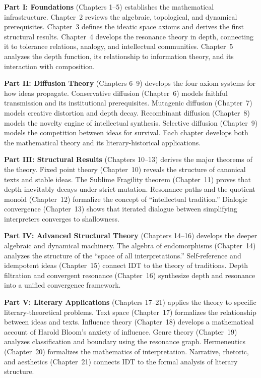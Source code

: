 \documentclass[11pt,openany]{book}
\theoremstyle{definition}
\theoremstyle{plain}
\theoremstyle{remark}
\begin{document}
\textbf{Part I: Foundations} (Chapters 1--5) establishes the mathematical infrastructure. Chapter~2 reviews the algebraic, topological, and dynamical prerequisites. Chapter~3 defines the ideatic space axioms and derives the first structural results. Chapter~4 develops the resonance theory in depth, connecting it to tolerance relations, analogy, and intellectual communities. Chapter~5 analyzes the depth function, its relationship to information theory, and its interaction with composition.

\textbf{Part II: Diffusion Theory} (Chapters 6--9) develops the four axiom systems for how ideas propagate. Conservative diffusion (Chapter~6) models faithful transmission and its institutional prerequisites. Mutagenic diffusion (Chapter~7) models creative distortion and depth decay. Recombinant diffusion (Chapter~8) models the novelty engine of intellectual synthesis. Selective diffusion (Chapter~9) models the competition between ideas for survival. Each chapter develops both the mathematical theory and its literary-historical applications.

\textbf{Part III: Structural Results} (Chapters 10--13) derives the major theorems of the theory. Fixed point theory (Chapter~10) reveals the structure of canonical texts and stable ideas. The Sublime Fragility theorem (Chapter~11) proves that depth inevitably decays under strict mutation. Resonance paths and the quotient monoid (Chapter~12) formalize the concept of ``intellectual tradition.'' Dialogic convergence (Chapter~13) shows that iterated dialogue between simplifying interpreters converges to shallowness.

\textbf{Part IV: Advanced Structural Theory} (Chapters 14--16) develops the deeper algebraic and dynamical machinery. The algebra of endomorphisms (Chapter~14) analyzes the structure of the ``space of all interpretations.'' Self-reference and idempotent ideas (Chapter~15) connect IDT to the theory of traditions. Depth filtration and convergent resonance (Chapter~16) synthesize depth and resonance into a unified convergence framework.

\textbf{Part V: Literary Applications} (Chapters 17--21) applies the theory to specific literary-theoretical problems. Text space (Chapter~17) formalizes the relationship between ideas and texts. Influence theory (Chapter~18) develops a mathematical account of Harold Bloom's anxiety of influence. Genre theory (Chapter~19) analyzes classification and boundary using the resonance graph. Hermeneutics (Chapter~20) formalizes the mathematics of interpretation. Narrative, rhetoric, and aesthetics (Chapter~21) connects IDT to the formal analysis of literary structure.
\end{document}
